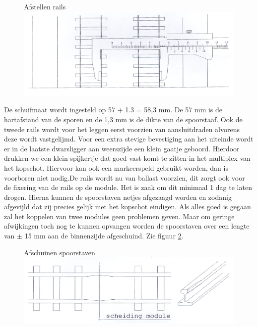 \documentclass[12pt,a4paper]{report}
\begin{document}
\begin{figure}[!ht]
  \captionbox
  {Afstellen rails\label{figuur5}}
  {\includegraphics[scale=1.0]{images/rcu_figuur5}}
\end{figure}

De schuifmaat wordt ingesteld op 57 + 1.3 = 58,3 mm. De 57 mm is de hartafstand van de sporen en de 1,3 mm is de dikte van de spoorstaaf.
Ook de tweede rails wordt voor het leggen eerst voorzien van aansluitdraden alvorens deze wordt vastgelijmd.
Voor een extra stevige bevestiging aan het uiteinde wordt er in de laatste dwarsligger aan weerszijde een klein gaatje geboord. Hierdoor drukken we een klein spijkertje dat goed vast komt te zitten in het multiplex van het kopschot. Hiervoor kan ook een markeerspeld gebruikt worden, dan is voorboren niet nodig.De rails wordt nu van ballast voorzien, dit zorgt ook voor de fixering van de rails op de module. Het is zaak om dit minimaal 1 dag te laten drogen.
Hierna kunnen de spoorstaven netjes afgezaagd worden en zodanig afgevijld dat zij precies gelijk met het kopschot eindigen. Als alles goed is gegaan zal het koppelen van twee modules geen problemen geven. Maar om geringe afwijkingen toch nog te kunnen opvangen worden de spoorstaven over een lengte van $\pm$ 15 mm aan de binnenzijde afgeschuind. Zie figuur \ref{figuur6}.

\begin{figure}[!ht]
  \captionbox
  {Afschuinen spoorstaven\label{figuur6}}
  {\includegraphics[scale=1.0]{images/rcu_figuur6}}
\end{figure}
\end{document}
